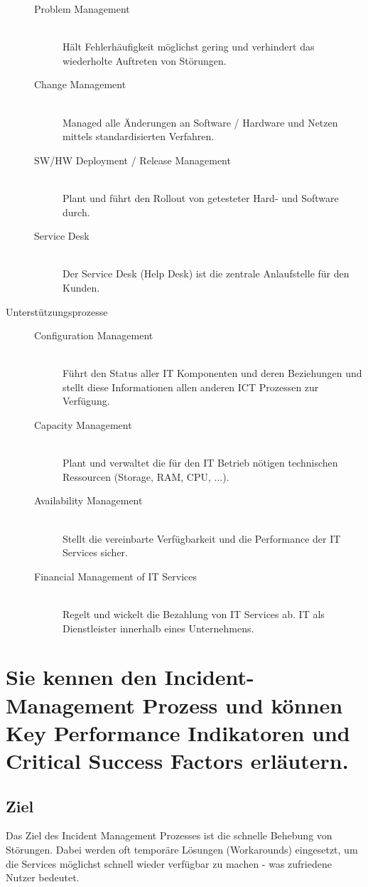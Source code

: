 \begin{description}
\begin{description}
		\item[Problem Management] \hfill \\
			Hält Fehlerhäufigkeit möglichst gering und verhindert das wiederholte Auftreten von Störungen.
		\item[Change Management] \hfill \\
			Managed alle Änderungen an Software / Hardware und Netzen mittels standardisierten Verfahren.		
		\item[SW/HW Deployment / Release Management] \hfill \\
			Plant und führt den Rollout von getesteter Hard- und Software durch.		
		\item[Service Desk] \hfill \\
			Der Service Desk (Help Desk) ist die zentrale Anlaufstelle für den Kunden.		
	\end{description}
	\item[Unterstützungsprozesse]
	\begin{description}
		\item[Configuration Management] \hfill \\
			Führt den Status aller IT Komponenten und deren Beziehungen und stellt diese Informationen allen anderen ICT Prozessen zur Verfügung.
		\item[Capacity Management] \hfill \\
			Plant und verwaltet die für den IT Betrieb nötigen technischen Ressourcen (Storage, RAM, CPU, ...).
		\item[Availability Management] \hfill \\
			Stellt die vereinbarte Verfügbarkeit und die Performance der IT Services sicher.
		\item[Financial Management of IT Services] \hfill \\
			Regelt und wickelt die Bezahlung von IT Services ab. IT als Dienstleister innerhalb eines Unternehmens.
	\end{description}
\end{description}

\section{Sie kennen den Incident-Management Prozess und können Key Performance Indikatoren und Critical Success Factors erläutern.}
\label{sec:incident-management}

\subsection{Ziel}
Das Ziel des Incident Management Prozesses ist die schnelle Behebung von Störungen. Dabei werden oft temporäre Lösungen (Workarounds) eingesetzt, um die Services möglichst schnell wieder verfügbar zu machen - was zufriedene Nutzer bedeutet.

